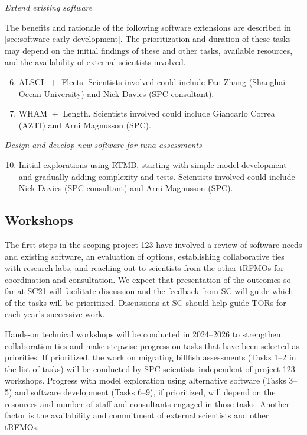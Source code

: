 \documentclass{SCreport}
\begin{document}
\textit{Extend existing software}

The benefits and rationale of the following software extensions are described in
\autoref{sec:software-early-development}. The prioritization and duration of
these tasks may depend on the initial findings of these and other tasks,
available resources, and the availability of external scientists involved.

\begin{enumerate}\setcounter{enumi}{5}
  \item ALSCL $\!+\!$ Fleets. Scientists involved could include Fan Zhang
  (Shanghai Ocean University) and Nick Davies (SPC consultant).
  \item WHAM $\!+\!$ Length. Scientists involved could include Giancarlo Correa
  (AZTI) and Arni Magnusson (SPC).
\end{enumerate}

\textit{Design and develop new software for tuna assessments}

\begin{enumerate}\setcounter{enumi}{9}
  \item Initial explorations using RTMB, starting with simple model development
  and gradually adding complexity and tests. Scientists involved could include
  Nick Davies (SPC consultant) and Arni Magnusson (SPC).
\end{enumerate}

\subsection{Workshops}

The first steps in the scoping project 123 have involved a review of software
needs and existing software, an evaluation of options, establishing
collaborative ties with research labs, and reaching out to scientists from the
other tRFMOs for coordination and consultation. We expect that presentation of
the outcomes so far at SC21 will facilitate discussion and the feedback from SC
will guide which of the tasks will be prioritized. Discussions at SC should help
guide TORs for each year's successive work.

Hands-on technical workshops will be conducted in 2024--2026 to strengthen
collaboration ties and make stepwise progress on tasks that have been selected
as priorities. If prioritized, the work on migrating billfish assessments (Tasks
1--2 in the list of tasks) will be conducted by SPC scientists independent of
project 123 workshops. Progress with model exploration using alternative
software (Tasks 3--5) and software development (Tasks 6--9), if prioritized,
will depend on the resources and number of staff and consultants engaged in
those tasks. Another factor is the availability and commitment of external
scientists and other tRFMOs.
\end{document}
